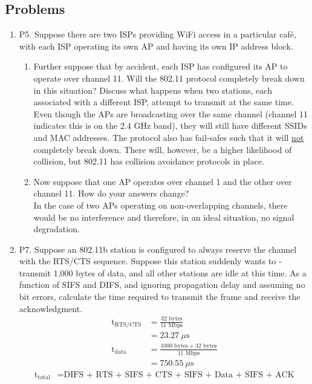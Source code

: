 \documentclass[12pt]{article}
\begin{document}
\subsection*{Problems}
\begin{enumerate}
	\item P5. Suppose there are two ISPs providing WiFi access in a particular café, with each ISP operating its own AP and having its own IP address block.
	\begin{enumerate}
		\item Further suppose that by accident, each ISP has configured its AP to operate over channel 11. Will the 802.11 protocol completely break down in this situation? Discuss what happens when two stations, each associated with a different ISP, attempt to transmit at the same time.\\[1em]
		Even though the APs are broadcasting over the same channel (channel 11 indicates this is on the 2.4 GHz band), they will still have different SSIDs and MAC addresses. The protocol also has fail-safes such that it will \underline{not} completely break down. There will, however, be a higher likelihood of collision, but 802.11 has collision avoidance protocols in place.
		\item Now suppose that one AP operates over channel 1 and the other over channel 11. How do your answers change?\\[1em]
		In the case of two APs operating on non-overlapping channels, there would be no interference and therefore, in an ideal situation, no signal degradation.
	\end{enumerate}
	\item P7. Suppose an 802.11b station is configured to always reserve the channel with the RTS/CTS sequence. Suppose this station suddenly wants to ­transmit 1,000 bytes of data, and all other stations are idle at this time. As a ­function of SIFS and DIFS, and ignoring propagation delay and assuming no bit errors, calculate the time required to transmit the frame and receive the acknowledgment.
	\begin{align*}
		\text{t}_{\text{RTS/CTS}}&=\frac{32\text{ bytes}}{11\text{ Mbps}}\\
		&=23.27\ \mu \text{s}\\
		\text{t}_{\text{data}}&=\frac{1000\text{ bytes}+32\text{ bytes}}{11\text{ Mbps}}\\
		&=750.55\ \mu \text{s}
	\end{align*}
	\begin{align*}
		\text{t}_{\text{total}}&=\text{DIFS + RTS + SIFS + CTS + SIFS + Data + SIFS + ACK}\\

\end{align*}
\end{enumerate}
\end{document}
